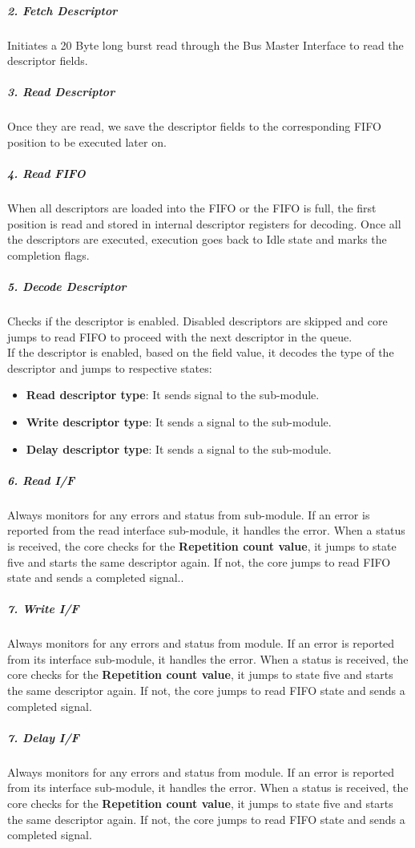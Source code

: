 \subparagraph{2. Fetch Descriptor}
Initiates a 20 Byte long burst read through the Bus Master Interface to read the descriptor fields.

\subparagraph{3. Read Descriptor}
Once they are read, we save the descriptor fields to the corresponding FIFO position to be executed later on.

\subparagraph{4. Read FIFO}
When all descriptors are loaded into the FIFO or the FIFO is full, the first position is read and stored in internal descriptor registers for decoding. Once all the descriptors are executed, execution goes back to Idle state and marks the completion flags.

\subparagraph{5. Decode Descriptor}
Checks if the descriptor is enabled. Disabled descriptors are skipped and core jumps to read FIFO to proceed with the next descriptor in the queue.\\
If the descriptor is enabled, based on the  field value, it decodes the type of the descriptor and jumps to respective states:
\begin{itemize}
 	\item \textbf{Read descriptor type}: It sends  signal to the  sub-module.
  	\item \textbf{Write descriptor type}: It sends a  signal to the  sub-module.
	\item \textbf{Delay descriptor type}: It sends a  signal to the  sub-module.
\end{itemize}

\subparagraph{6. Read I/F}
Always monitors for any errors and status from  sub-module. If an error is reported from the read interface sub-module, it handles the error. When a  status is received, the core checks for the \textbf{Repetition count value}, it jumps to state five and starts the same descriptor again. If not, the core jumps to read FIFO state and sends a completed signal..

\subparagraph{7. Write I/F}
Always monitors for any errors and status from  module. If an error is reported from its interface sub-module, it handles the error. When a  status is received, the core checks for the \textbf{Repetition count value}, it jumps to state five and starts the same descriptor again. If not, the core jumps to read FIFO state and sends a completed signal.\\

\subparagraph{7. Delay I/F}
Always monitors for any errors and status from  module. If an error is reported from its interface sub-module, it handles the error. When a  status is received, the core checks for the \textbf{Repetition count value}, it jumps to state five and starts the same descriptor again. If not, the core jumps to read FIFO state and sends a completed signal.\\
\vspace{1cm}




